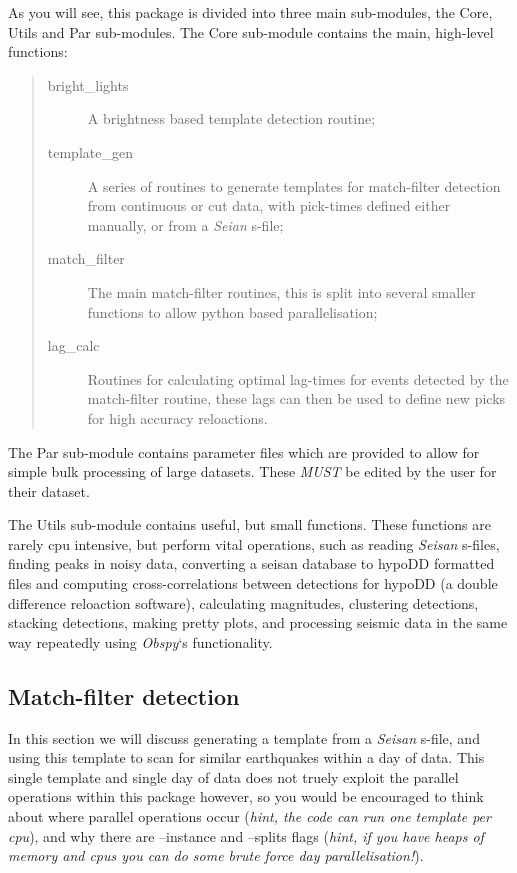 \documentclass[a4paper,10pt,english]{sphinxmanual}
\begin{document}
As you will see, this package is divided into three main sub-modules, the
Core, Utils and Par sub-modules.  The Core sub-module contains the main, high-level
functions:
\begin{quote}\begin{description}
\item[{bright\_lights}] \leavevmode
A brightness based template detection routine;

\item[{template\_gen}] \leavevmode
A series of routines to generate templates for match-filter detection
from continuous or cut data, with pick-times defined either manually, or from a
\emph{Seian} s-file;

\item[{match\_filter}] \leavevmode
The main match-filter routines, this is split into several
smaller functions to allow python based parallelisation;

\item[{lag\_calc}] \leavevmode
Routines for calculating optimal lag-times for events detected
by the match-filter routine, these lags can then be used to define new picks
for high accuracy reloactions.

\end{description}\end{quote}

The Par sub-module contains parameter files which are provided to allow for simple
bulk processing of large datasets.  These \emph{MUST} be edited by the user for their
dataset.

The Utils sub-module contains useful, but small functions.  These functions are
rarely cpu intensive, but perform vital operations, such as reading \emph{Seisan} s-files,
finding peaks in noisy data, converting a seisan database to hypoDD formatted
files and computing cross-correlations between detections for hypoDD (a double
difference reloaction software), calculating magnitudes, clustering detections,
stacking detections, making pretty plots, and processing seismic data in the
same way repeatedly using \emph{Obspy}`s functionality.


\subsection{Match-filter detection}
\label{tutorial:match-filter-detection}
In this section we will discuss generating a template from a \emph{Seisan} s-file, and
using this template to scan for similar earthquakes within a day of data.  This single
template and single day of data does not truely exploit the parallel operations within
this package however, so you would be encouraged to think about where parallel operations
occur (\emph{hint, the code can run one template per cpu}), and why there are --instance and
--splits flags (\emph{hint, if you have heaps of memory and cpus you can do some brute
force day parallelisation!}).
\end{document}
